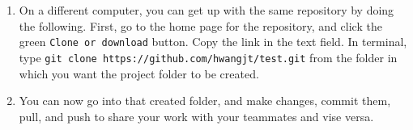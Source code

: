 \documentclass{article}
\begin{document}
\begin{enumerate}
    \item On a different computer, you can get up with the same repository by doing the following. First, go to the home page for the repository, and click the green \texttt{Clone or download} button. Copy the link in the text field. In terminal, type \texttt{git clone https://github.com/hwangjt/test.git} from the folder in which you want the project folder to be created.
    \item You can now go into that created folder, and make changes, commit them, pull, and push to share your work with your teammates and vise versa.
\end{enumerate}
\end{document}
